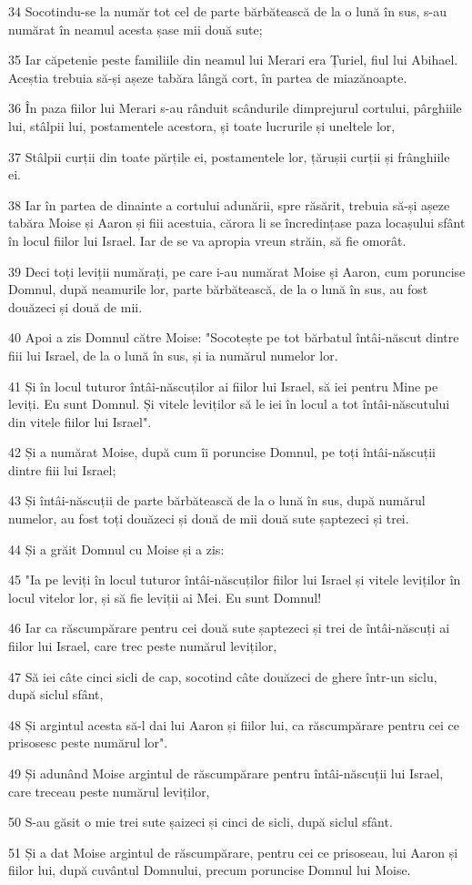 \par 34 Socotindu-se la număr tot cel de parte bărbătească de la o lună în sus, s-au numărat în neamul acesta șase mii două sute;
\par 35 Iar căpetenie peste familiile din neamul lui Merari era Țuriel, fiul lui Abihael. Aceștia trebuia să-și așeze tabăra lângă cort, în partea de miazănoapte.
\par 36 În paza fiilor lui Merari s-au rânduit scândurile dimprejurul cortului, pârghiile lui, stâlpii lui, postamentele acestora, și toate lucrurile și uneltele lor,
\par 37 Stâlpii curții din toate părțile ei, postamentele lor, țărușii curții și frânghiile ei.
\par 38 Iar în partea de dinainte a cortului adunării, spre răsărit, trebuia să-și așeze tabăra Moise și Aaron și fiii acestuia, cărora li se încredințase paza locașului sfânt în locul fiilor lui Israel. Iar de se va apropia vreun străin, să fie omorât.
\par 39 Deci toți leviții numărați, pe care i-au numărat Moise și Aaron, cum poruncise Domnul, după neamurile lor, parte bărbătească, de la o lună în sus, au fost douăzeci și două de mii.
\par 40 Apoi a zis Domnul către Moise: "Socotește pe tot bărbatul întâi-născut dintre fiii lui Israel, de la o lună în sus, și ia numărul numelor lor.
\par 41 Și în locul tuturor întâi-născuților ai fiilor lui Israel, să iei pentru Mine pe leviți. Eu sunt Domnul. Și vitele leviților să le iei în locul a tot întâi-născutului din vitele fiilor lui Israel".
\par 42 Și a numărat Moise, după cum îi poruncise Domnul, pe toți întâi-născuții dintre fiii lui Israel;
\par 43 Și întâi-născuții de parte bărbătească de la o lună în sus, după numărul numelor, au fost toți douăzeci și două de mii două sute șaptezeci și trei.
\par 44 Și a grăit Domnul cu Moise și a zis:
\par 45 "Ia pe leviți în locul tuturor întâi-născuților fiilor lui Israel și vitele leviților în locul vitelor lor, și să fie leviții ai Mei. Eu sunt Domnul!
\par 46 Iar ca răscumpărare pentru cei două sute șaptezeci și trei de întâi-născuți ai fiilor lui Israel, care trec peste numărul leviților,
\par 47 Să iei câte cinci sicli de cap, socotind câte douăzeci de ghere într-un siclu, după siclul sfânt,
\par 48 Și argintul acesta să-l dai lui Aaron și fiilor lui, ca răscumpărare pentru cei ce prisosesc peste numărul lor".
\par 49 Și adunând Moise argintul de răscumpărare pentru întâi-născuții lui Israel, care treceau peste numărul leviților,
\par 50 S-au găsit o mie trei sute șaizeci și cinci de sicli, după siclul sfânt.
\par 51 Și a dat Moise argintul de răscumpărare, pentru cei ce prisoseau, lui Aaron și fiilor lui, după cuvântul Domnului, precum poruncise Domnul lui Moise.

